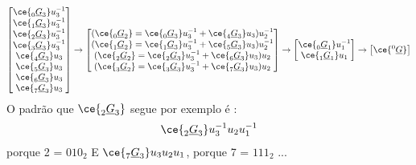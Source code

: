 \begin{align*}
\begin{bmatrix}
\ce{^{\ }_{0}\underline{G}_{3}}u_{3}^{-1} \\
\ce{^{\ }_{1}\underline{G}_{3}}u_{3}^{-1} \\
\ce{^{\ }_{2}\underline{G}_{3}}u_{3}^{-1} \\
\ce{^{\ }_{3}\underline{G}_{3}}u_{3}^{-1} \\
\ce{^{\ }_{4}\underline{G}_{3}}u_{3} \\
\ce{^{\ }_{5}\underline{G}_{3}}u_{3} \\
\ce{^{\ }_{6}\underline{G}_{3}}u_{3} \\
\ce{^{\ }_{7}\underline{G}_{3}}u_{3} \\
\end{bmatrix}\rightarrow
\begin{bmatrix}
(\ce{^{\ }_{0}\underline{G}_{2}}=\ce{^{\ }_{0}\underline{G}_{3}}u_{3}^{-1} + \ce{^{\ }_{4}\underline{G}_{3}}u_{3})u_{2}^{-1} \\
(\ce{^{\ }_{1}\underline{G}_{2}}=\ce{^{\ }_{1}\underline{G}_{3}}u_{3}^{-1} + \ce{^{\ }_{5}\underline{G}_{3}}u_{3})u_{2}^{-1} \\
(\ce{^{\ }_{2}\underline{G}_{2}}=\ce{^{\ }_{2}\underline{G}_{3}}u_{3}^{-1} + \ce{^{\ }_{6}\underline{G}_{3}}u_{3})u_{2} \\
(\ce{^{\ }_{3}\underline{G}_{2}}=\ce{^{\ }_{3}\underline{G}_{3}}u_{3}^{-1} + \ce{^{\ }_{7}\underline{G}_{3}}u_{3})u_{2} \\
\end{bmatrix}\rightarrow
\begin{bmatrix}
\ce{^{\ }_{0}\underline{G}_{1}}u_{1}^{-1} \\
\ce{^{\ }_{1}\underline{G}_{1}}u_{1} \\
\end{bmatrix}\rightarrow
\begin{bmatrix}
\ce{^{0}_{\ }\underline{G}} \\
\end{bmatrix}
\end{align*}
\newline\newline\newline\newline
O padrão que $\ce{^{\ }_{2}\underline{G}_{3}}$ segue por exemplo é :
\begin{align*}
\ce{^{\ }_{2}\underline{G}_{3}}u_{3}^{-1}u_{2}u_{1}^{-1}  
\end{align*}
\quad\quad\quad\quad\quad\quad\quad\quad\quad\quad\quad\quad\quad\quad porque 2 = $010_2$ \newline
E $\ce{^{\ }_{7}\underline{G}_{3}}u_{3}u_{2}u_{1}$,  porque 7 = $111_2$ ... \newline


